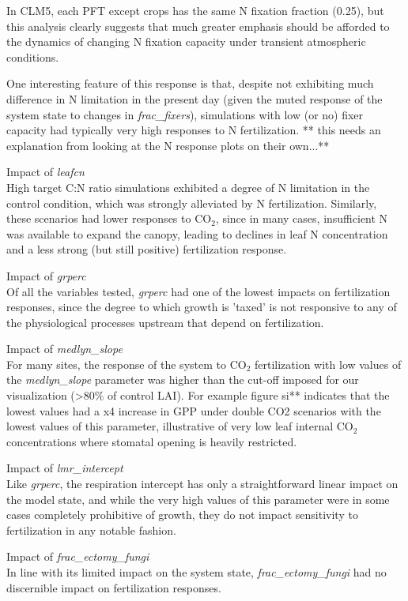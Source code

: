 \documentclass[draft,linenumbers]{agujournal}
\begin{document}
In CLM5, each PFT except crops has the same N fixation fraction (0.25), but this analysis clearly suggests that much greater emphasis should be afforded to the dynamics of changing N fixation capacity under transient atmospheric conditions.

One interesting feature of this response is that, despite not exhibiting much difference in N limitation in the present day (given the muted response of the system state to changes in \emph{frac\_fixers}), simulations with low (or no) fixer capacity had typically very high responses to N fertilization.  ** this needs an explanation from looking at the N response plots on their own...**

Impact of \emph{leafcn}\\
 High target C:N ratio simulations exhibited a degree of N limitation in the control condition, which was strongly alleviated by N fertilization. Similarly, these scenarios had lower responses to CO$_{2}$, since in many cases, insufficient N was available to expand the canopy, leading to declines in leaf N concentration and a less strong (but still positive) fertilization response. 

Impact of \emph{grperc}\\
Of all the variables tested, \emph{grperc} had one of the lowest impacts on fertilization responses, since the degree to which growth is 'taxed' is not responsive to any of the physiological processes upstream that depend on fertilization.

Impact of \emph{medlyn\_slope}\\
For many sites, the response of the system to CO$_{2}$ fertilization with low values of the \emph{medlyn\_slope} parameter was higher than the cut-off imposed for our visualization (>80\% of control LAI). For example figure si** indicates that the lowest values had a x4 increase in GPP under double CO2 scenarios with the lowest values of this parameter, illustrative of very low leaf internal CO$_{2}$ concentrations where stomatal opening is heavily restricted.

Impact of \emph{lmr\_intercept}\\
Like \emph{grperc}, the respiration intercept has only a straightforward linear impact on the model state, and while the very high values of this parameter were in some cases completely prohibitive of growth, they do not impact sensitivity to fertilization in any notable fashion. 

Impact of \emph{frac\_ectomy\_fungi}\\
In line with its limited impact on the system state, \emph{frac\_ectomy\_fungi} had no discernible impact on fertilization responses. 
\end{document}
